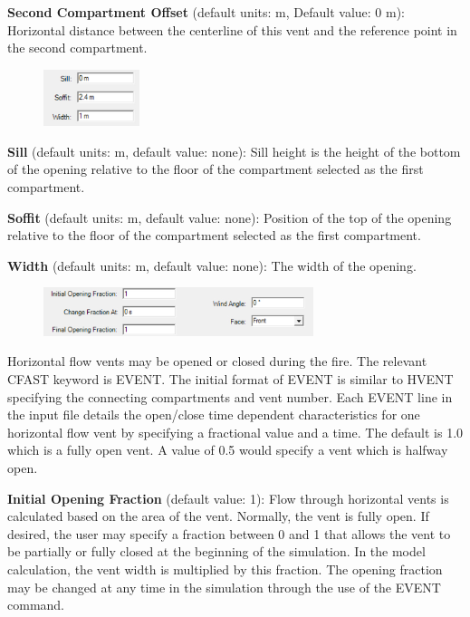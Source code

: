 \textbf{Second Compartment Offset } (default units: m, Default value: 0 m): Horizontal distance between the centerline of this vent and the reference point in the second compartment.

\begin{figure}[h!]
\begin{center}
\includegraphics[width=1.1in]{FIGURES/Input_File/Vent_Size}
\end{center}
\end{figure}

\textbf{Sill} (default units: m, default value: none): Sill height is the height of the bottom of the opening relative to the floor of the compartment selected as the first compartment. 

\textbf{Soffit} (default units: m, default value: none): Position of the top of the opening relative to the floor of the compartment selected as the first compartment.   

\textbf{Width} (default units: m, default value: none): The width of the opening.

\begin{figure}[h!]
\begin{center}
\includegraphics[width=3.1in]{FIGURES/Input_File/Vent_Open_Close}
\end{center}
\end{figure}

Horizontal flow vents may be opened or closed during the fire. The relevant CFAST keyword is EVENT. The initial format of EVENT is similar to HVENT specifying the connecting compartments and vent number.  Each EVENT line in the input file details the open/close time dependent characteristics for one horizontal flow vent by specifying a fractional value and a time.  The default is 1.0 which is a fully open vent.  A value of 0.5 would specify a vent which is halfway open.

\textbf{Initial Opening Fraction} (default value: 1): Flow through horizontal vents is calculated based on the area of the vent.  Normally, the vent is fully open.  If desired, the user may specify a fraction between 0 and 1 that allows the vent to be partially or fully closed at the beginning of the simulation.  In the model calculation, the vent width is multiplied by this fraction.  The opening fraction may be changed at any time in the simulation through the use of the EVENT command.

